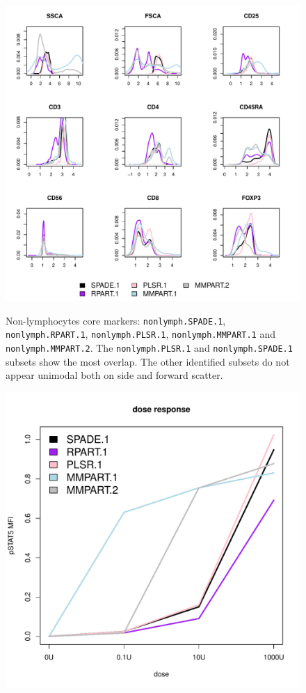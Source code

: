 \begin{figure}
\centering
\begin{minipage}{.65\textwidth}
\includegraphics[width=\linewidth]{figures/final-nonlymphocytes-clusters}
\end{minipage}
{ Non-lymphocytes core markers: \texttt{nonlymph.SPADE.1}, \texttt{nonlymph.RPART.1}, \texttt{nonlymph.PLSR.1}, \texttt{nonlymph.MMPART.1} and \texttt{nonlymph.MMPART.2}. }
{
    The \texttt{nonlymph.PLSR.1} and \texttt{nonlymph.SPADE.1} subsets show the most overlap.
    The other identified subsets do not appear unimodal both on side and forward scatter.
}
\begin{minipage}{.5\textwidth}
  \includegraphics[scale=0.4]{figures/final-nonlymphocytes-dose-response}

\end{minipage}
\end{figure}
